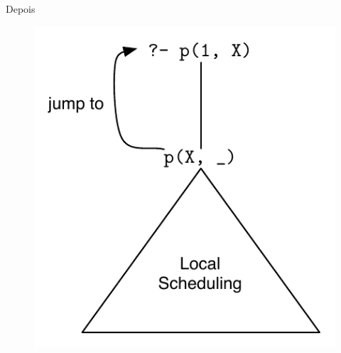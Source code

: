 \documentclass{beamer}
\begin{document}
\begin{frame}
\begin{columns}[t]
\begin{block}{Depois}
\begin{figure}[ht]
               \includegraphics[scale=0.30]{internal2.pdf}
           \end{figure}
         \end{block}
     \end{columns}
\end{frame}
\end{document}
